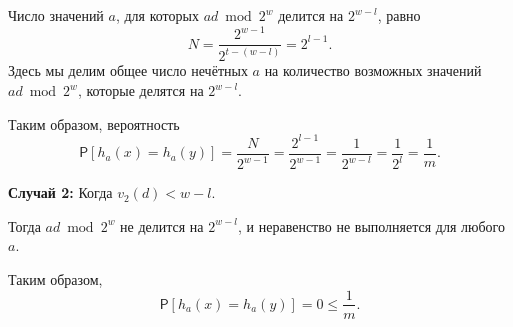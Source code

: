 \documentclass[11pt]{article}
\newcommand{\Prb}{\ensuremath{\mathsf{P}}}  %
\renewcommand{\le}{\leqslant}   %
\begin{document}
\begin{solution}
\begin{enumerate}
          Число значений $a$, для которых $a d \bmod 2^w$ делится на $2^{w - l}$, равно
          \[
              N = \dfrac{2^{w - 1}}{2^{t - (w - l)}} = 2^{l - 1}.
          \]
          Здесь мы делим общее число нечётных $a$ на количество возможных значений $a d \bmod 2^w$, которые делятся на $2^{w - l}$.

          Таким образом, вероятность
          \[
              \Prb[h_{a}(x) = h_{a}(y)] = \dfrac{N}{2^{w - 1}} = \dfrac{2^{l - 1}}{2^{w - 1}} = \dfrac{1}{2^{w - l}} = \dfrac{1}{2^{l}} = \dfrac{1}{m}.
          \]

          \textbf{Случай 2:} Когда $v_2(d) < w - l$.

          Тогда $a d \bmod 2^w$ не делится на $2^{w - l}$, и неравенство не выполняется для любого $a$.

          Таким образом,
          \[
              \Prb[h_{a}(x) = h_{a}(y)] = 0 \le \dfrac{1}{m}.
          \]
\end{enumerate}
\end{solution}
\end{document}
